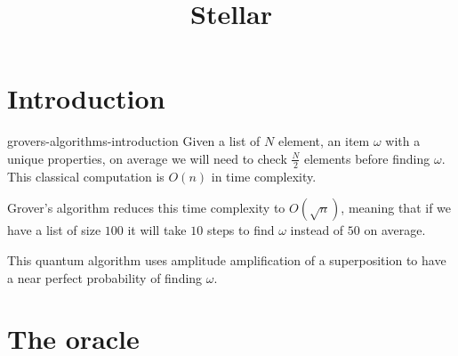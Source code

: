 \documentclass[preview]{standalone}
\begin{document}
\title{Stellar}
\genpage

\section{Introduction}

\begin{snippet}{grovers-algorithms-introduction}
    Given a list of \(N\) element, an item \(\omega\) with a unique properties, on average we will need to check \(\frac{N}{2}\) elements before finding \(\omega\).
    This classical computation is \(O(n)\) in time complexity.

    Grover's algorithm reduces this time complexity to \(O(\sqrt{n})\), meaning that if we have a list of size \(100\) it will take \(10\) steps to find \(\omega\) instead of \(50\) on average.

    This quantum algorithm uses amplitude amplification of a superposition to have a near perfect probability of finding \(\omega\).
\end{snippet}

\section{The oracle}
\end{document}
